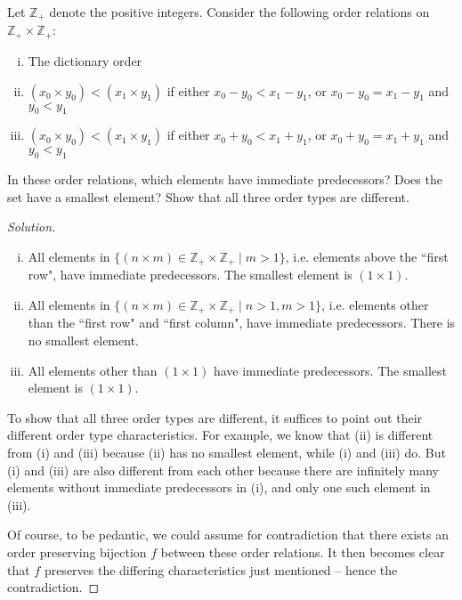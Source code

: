\documentclass[11pt]{article}
\newcommand{\phantombackup}[1]{{\textcolor{white}{#1}}}
\newenvironment{ex}[2][Exercise]{
  \begin{trivlist}
    \item[\hskip \labelsep {\bfseries #1}\hskip \labelsep {\bfseries #2.}]}
  {\end{trivlist}}
\newenvironment{solution}{\begin{proof}[Solution]}{\end{proof}}
\begin{document}
\begin{ex}{3.12}
  Let $\mathbb{Z}_+$ denote the positive integers. Consider the following order relations on $\mathbb{Z}_+ \times \mathbb{Z}_+$:
  \begin{enumerate}[(i)]
    \item The dictionary order
    \item $(x_0 \times y_0) < (x_1 \times y_1)$ if either $x_0 - y_0 < x_1 -
      y_1$, or $x_0 - y_0 = x_1 - y_1$ and $y_0 < y_1$
    \item $(x_0 \times y_0) < (x_1 \times y_1)$ if either $x_0 + y_0 < x_1 +
      y_1$, or $x_0 + y_0 = x_1 + y_1$ and $y_0 < y_1$
  \end{enumerate}
  In these order relations, which elements have immediate predecessors? Does the set have a smallest element? Show that all three order types are different.
\end{ex}

\begin{solution}

  \phantombackup{what}

  \begin{enumerate}[(i)]
    \item All elements in $\{ (n \times m) \in \mathbb{Z}_+ \times \mathbb{Z}_+
      \mid m > 1 \}$, i.e. elements above the ``first row", have immediate
      predecessors. The smallest element is $(1 \times 1)$.
    \item All elements in $\{ (n \times m) \in \mathbb{Z}_+ \times \mathbb{Z}_+
      \mid n > 1, m > 1 \}$, i.e. elements other than the ``first row" and
      ``first column", have immediate predecessors. There is no smallest
      element.
    \item All elements other than $(1 \times 1)$ have immediate predecessors.
      The smallest element is $(1 \times 1)$.
  \end{enumerate}

  To show that all three order types are different, it suffices to point
  out their different order type characteristics. For example, we know that
  (ii) is different from (i) and (iii) because (ii) has no smallest element,
  while (i) and (iii) do. But (i) and (iii) are also different from each other
  because there are infinitely many elements without immediate predecessors in
  (i), and only one such element in (iii).

  Of course, to be pedantic, we could assume for contradiction that there
  exists an order preserving bijection $f$ between these order relations. It
  then becomes clear that $f$ preserves the differing characteristics just
  mentioned -- hence the contradiction.
\end{solution}
\end{document}
